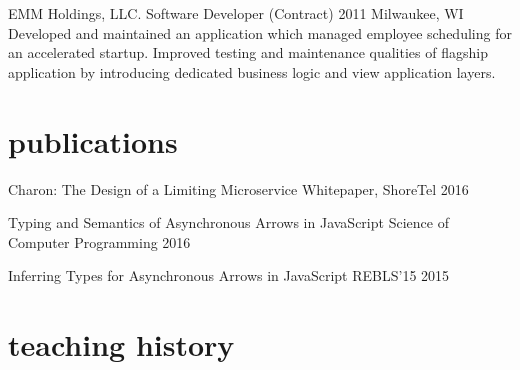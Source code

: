 \documentclass[]{clean-resume}
\begin{document}
\entry
  {EMM Holdings, LLC.}
  {Software Developer (Contract)}
  {2011}
  {Milwaukee, WI}
  {
    Developed and maintained an application which managed employee scheduling for an accelerated startup. Improved testing and maintenance qualities of flagship application by introducing dedicated business logic and view application layers.
  }

\section{publications}

\shortentry
  {Charon: The Design of a Limiting Microservice}
  {Whitepaper, ShoreTel}
  {2016}

\shortentry
  {Typing and Semantics of Asynchronous Arrows in JavaScript}
  {Science of Computer Programming}
  {2016}

\shortentry
  {Inferring Types for Asynchronous Arrows in JavaScript}
  {REBLS'15}
  {2015}

\section{teaching history}
\end{document}
